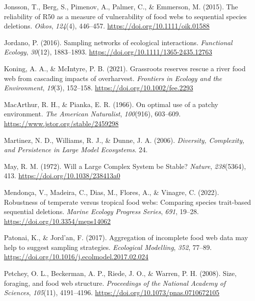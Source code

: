 \documentclass{article}
\newlength{\cslhangindent}
\newlength{\cslentryspacingunit} %
\newenvironment{CSLReferences}[2] %
 {%
  \setlength{\parindent}{0pt}
  \ifodd #1
  \let\oldpar\par
  \def\par{\hangindent=\cslhangindent\oldpar}
  \fi
  \setlength{\parskip}{#2\cslentryspacingunit}
 }%
 {}
\begin{document}
\begin{CSLReferences}{1}{0}
\leavevmode{}%
Jonsson, T., Berg, S., Pimenov, A., Palmer, C., \& Emmerson, M. (2015).
The reliability of {R50} as a measure of vulnerability of food webs to
sequential species deletions. \emph{Oikos}, \emph{124}(4), 446--457.
\url{https://doi.org/10.1111/oik.01588}

\leavevmode{}%
Jordano, P. (2016). Sampling networks of ecological interactions.
\emph{Functional Ecology}, \emph{30}(12), 1883--1893.
\url{https://doi.org/10.1111/1365-2435.12763}

\leavevmode{}%
Koning, A. A., \& McIntyre, P. B. (2021). Grassroots reserves rescue a
river food web from cascading impacts of overharvest. \emph{Frontiers in
Ecology and the Environment}, \emph{19}(3), 152--158.
\url{https://doi.org/10.1002/fee.2293}

\leavevmode{}%
MacArthur, R. H., \& Pianka, E. R. (1966). On optimal use of a patchy
environment. \emph{The American Naturalist}, \emph{100}(916), 603--609.
\url{https://www.jstor.org/stable/2459298}

\leavevmode{}%
Martinez, N. D., Williams, R. J., \& Dunne, J. A. (2006).
\emph{Diversity, {Complexity}, and {Persistence} in {Large Model
Ecosystems}}. 24.

\leavevmode{}%
May, R. M. (1972). Will a {Large Complex System} be {Stable}?
\emph{Nature}, \emph{238}(5364), 413.
\url{https://doi.org/10.1038/238413a0}

\leavevmode{}%
Mendonça, V., Madeira, C., Dias, M., Flores, A., \& Vinagre, C. (2022).
Robustness of temperate versus tropical food webs: Comparing species
trait-based sequential deletions. \emph{Marine Ecology Progress Series},
\emph{691}, 19--28. \url{https://doi.org/10.3354/meps14062}

\leavevmode{}%
Patonai, K., \& Jord'an, F. (2017). Aggregation of incomplete food web
data may help to suggest sampling strategies. \emph{Ecological
Modelling}, \emph{352}, 77--89.
\url{https://doi.org/10.1016/j.ecolmodel.2017.02.024}

\leavevmode{}%
Petchey, O. L., Beckerman, A. P., Riede, J. O., \& Warren, P. H. (2008).
Size, foraging, and food web structure. \emph{Proceedings of the
National Academy of Sciences}, \emph{105}(11), 4191--4196.
\url{https://doi.org/10.1073/pnas.0710672105}


\end{CSLReferences}
\end{document}
